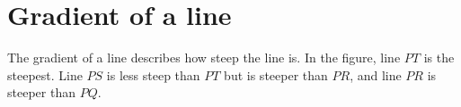     \addtocounter{footnote}{-0}
    \par 
      \label{m39107**end}
          
%     
%     
%     
    
    
    
  
      \label{m39108*uid40}
            \section{ Gradient of a line}
            \nopagebreak
            

\label{m39108*id67971}The gradient of a line describes how steep the line is. In the figure, line \begin{math}PT\end{math} is the steepest. Line \begin{math}PS\end{math} is less steep than \begin{math}PT\end{math} but is steeper than \begin{math}PR\end{math}, and line \begin{math}PR\end{math} is steeper than \begin{math}PQ\end{math}.\par 
        
    \setcounter{subfigure}{0}



